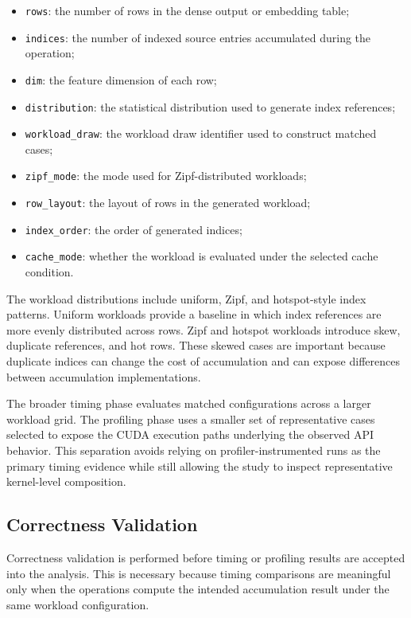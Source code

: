 \begin{itemize}[leftmargin=*]
    \item \texttt{rows}: the number of rows in the dense output or embedding table;
    \item \texttt{indices}: the number of indexed source entries accumulated during the operation;
    \item \texttt{dim}: the feature dimension of each row;
    \item \texttt{distribution}: the statistical distribution used to generate index references;
    \item \texttt{workload\_draw}: the workload draw identifier used to construct matched cases;
    \item \texttt{zipf\_mode}: the mode used for Zipf-distributed workloads;
    \item \texttt{row\_layout}: the layout of rows in the generated workload;
    \item \texttt{index\_order}: the order of generated indices;
    \item \texttt{cache\_mode}: whether the workload is evaluated under the selected cache condition.
\end{itemize}

The workload distributions include uniform, Zipf, and hotspot-style index patterns. Uniform workloads provide a baseline in which index references are more evenly distributed across rows. Zipf and hotspot workloads introduce skew, duplicate references, and hot rows. These skewed cases are important because duplicate indices can change the cost of accumulation and can expose differences between accumulation implementations.

The broader timing phase evaluates matched configurations across a larger workload grid. The profiling phase uses a smaller set of representative cases selected to expose the CUDA execution paths underlying the observed API behavior. This separation avoids relying on profiler-instrumented runs as the primary timing evidence while still allowing the study to inspect representative kernel-level composition.

\subsection{Correctness Validation}

Correctness validation is performed before timing or profiling results are accepted into the analysis. This is necessary because timing comparisons are meaningful only when the operations compute the intended accumulation result under the same workload configuration.

